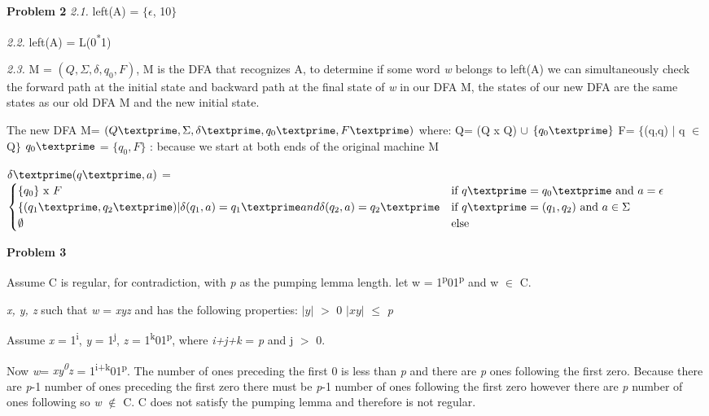 \documentclass[12pt]{report}
\begin{document}
\textbf{Problem 2}\newline
\textit{2.1.} left(A) = $\{\epsilon$, 10$\}$

\textit{2.2.} left(A) = L(0\textsuperscript{*}1)

\textit{2.3.}
M = $(Q,\Sigma, \delta, q_0, F)$,  
M is the DFA that recognizes A, to determine if some word \textit{w} belongs to left(A) we can simultaneously check the forward path at the initial state and backward path at the final state of \textit{w} in our DFA M, the states of our new DFA are the same states as our old DFA M and the new initial state.

The new DFA M\textprime = $(Q\textprime, \Sigma, \delta\textprime, q_0\textprime, F\textprime)$ where: \newline
\tab Q\textprime = (Q x Q) $\cup$ $\{q_0\textprime\}$\newline
\tab F\textprime = $\{$(q,q) $\vert$ q $\in$ Q$\}$\newline
\tab $q_0\textprime$ =  $\{ q_0, F \}$ {\footnotesize: because we start at both ends of the original machine M}

\tab $\delta\textprime(q\textprime, a)$ = $\begin{cases}
	\{q_0\} \text{ x }F  							&\text{if } q\textprime  = q_0\textprime \text{ and }a = \epsilon\\
	\{(q_1\textprime, q_2\textprime) \vert \delta(q_1, a) = q_1\textprime and \delta(q_2, a) = q_2\textprime	&\text{if } q\textprime = (q_1, q_2) \text{ and } a \in \Sigma\\
	\emptyset 									& \text{else}\\
\end{cases}$



\textbf{Problem 3}
\begin{flushleft}
	Assume C is regular, for contradiction, with \textit{p} as the pumping lemma length.  let w = 1\textsuperscript{p}01\textsuperscript{p} and w $\in$ C. 
	
	\textit{x, y, z } such that \textit{w} = \textit{xyz} and has the following properties:\newline
	\tab $\vert\textit{y}\vert$ $>$ 0\newline
	\tab $\vert\textit{xy}\vert$ $\leq$ \textit{p}
	
	Assume \textit{x} = 1\textsuperscript{i}, \textit{y} = 1\textsuperscript{j}, \textit{z} = 1\textsuperscript{k}01\textsuperscript{p}, where \textit{i+j+k} = \textit{p} and j $>$ 0.
	
	Now \textit{w}\textprime = \textit{xy\textsuperscript{0}z} = 1\textsuperscript{i+k}01\textsuperscript{p}. The number of ones preceding the first 0 is less than \textit{p} and there are \textit{p} ones following the first zero.  Because there are \textit{p}-1 number of ones preceding the first zero there must be \textit{p}-1 number of ones following the first zero however there are \textit{p} number of ones following so \newline \textit{w} $\notin$ C.  C does not satisfy the pumping lemma and therefore is not regular.
	
\end{flushleft}
\end{document}
